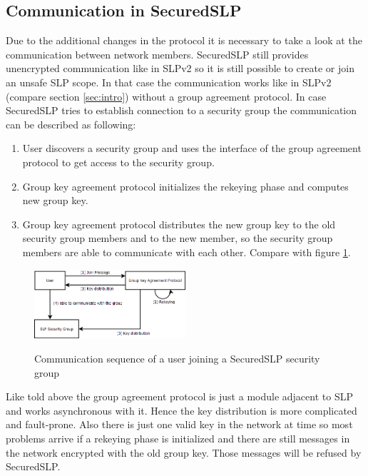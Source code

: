 \subsection{Communication in SecuredSLP}
Due to the additional changes in the protocol it is necessary to take a look at the communication between network members. SecuredSLP still provides unencrypted communication like in SLPv2 so it is still possible to create or join an unsafe SLP scope. In that case the communication works like in SLPv2 (compare section \ref{sec:intro}) without a group agreement protocol. In case SecuredSLP tries to establish connection to a security group the communication can be described as following:
\begin{enumerate}
  \item User discovers a security group and uses the interface of the group agreement protocol to get access to the security group.
  \item Group key agreement protocol initializes the rekeying phase and computes new group key.
  \item Group key agreement protocol distributes the new group key to the old security group members and to the new member, so the security group members are able to communicate with each other. Compare with figure \ref{fig:sslp_join}.
\end{enumerate}
\begin{figure}[!h]
\centering\includegraphics[width=0.5\textwidth]{Images/sSLP_join}
\label{fig:sslp_join}
\caption{Communication sequence of a user joining a SecuredSLP security group}
\end{figure}
Like told above the group agreement protocol is just a module adjacent to SLP and works asynchronous with it. Hence the key distribution is more complicated and fault-prone. Also there is just one valid key in the network at time so most problems arrive if a rekeying phase is initialized and there are still messages in the network encrypted with the old group key. Those messages will be refused by SecuredSLP. 